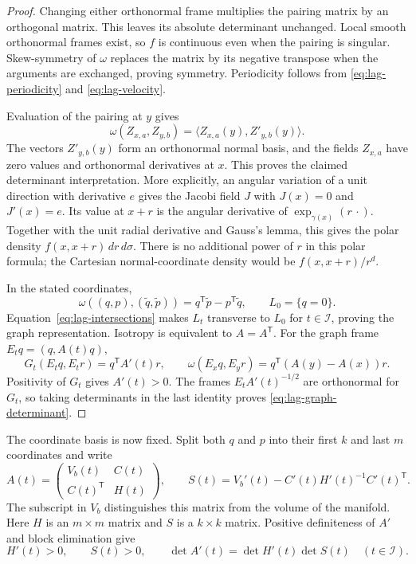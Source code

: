 \begin{proof}
Changing either orthonormal frame multiplies the pairing matrix by an
orthogonal matrix.  This leaves its absolute determinant unchanged.
Local smooth orthonormal frames exist, so $f$ is continuous even when
the pairing is singular.  Skew-symmetry of $\omega$ replaces the matrix
by its negative transpose when the arguments are exchanged, proving
symmetry.  Periodicity follows from
\eqref{eq:lag-periodicity} and \eqref{eq:lag-velocity}.

Evaluation of the pairing at $y$ gives
\[
 \omega(Z_{x,a},Z_{y,b})
 =\langle Z_{x,a}(y),Z'_{y,b}(y)\rangle.
\]
The vectors $Z'_{y,b}(y)$ form an orthonormal normal basis, and the
fields $Z_{x,a}$ have zero values and orthonormal derivatives at $x$.
This proves the claimed determinant interpretation.  More explicitly,
an angular variation of a unit direction with derivative $e$ gives the
Jacobi field $J$ with $J(x)=0$ and $J'(x)=e$.  Its value at $x+r$ is the
angular derivative of $\exp_{\gamma(x)}(r\,\cdot)$.  Together with the
unit radial derivative and Gauss's lemma, this gives the polar density
$f(x,x+r)\,dr\,d\sigma$.  There is no additional power of $r$ in this
polar formula; the Cartesian normal-coordinate density would be
$f(x,x+r)/r^d$.

In the stated coordinates,
\[
 \omega((q,p),(\widetilde q,\widetilde p))
 =q^{\mathsf T}\widetilde p-p^{\mathsf T}\widetilde q,
 \qquad L_0=\{q=0\}.
\]
Equation~\eqref{eq:lag-intersections} makes $L_t$ transverse to $L_0$
for $t\in\mathcal I$, proving the graph representation.  Isotropy is
equivalent to $A=A^{\mathsf T}$.  For the graph frame
$E_tq=(q,A(t)q)$,
\[
 G_t(E_tq,E_tr)=q^{\mathsf T}A'(t)r,
 \qquad
 \omega(E_xq,E_yr)=q^{\mathsf T}(A(y)-A(x))r.
\]
Positivity of $G_t$ gives $A'(t)>0$.  The frames
$E_tA'(t)^{-1/2}$ are orthonormal for $G_t$, so taking determinants in
the last identity proves \eqref{eq:lag-graph-determinant}.
\end{proof}

The coordinate basis is now fixed.  Split both $q$ and $p$ into their
first $k$ and last $m$ coordinates and write
\begin{equation}
 A(t)=
 \begin{pmatrix}
  V_b(t)&C(t)\\ C(t)^{\mathsf T}&H(t)
 \end{pmatrix},
 \qquad
 S(t)=V_b'(t)-C'(t)H'(t)^{-1}C'(t)^{\mathsf T}.
 \label{eq:lag-blocks}
\end{equation}
The subscript in $V_b$ distinguishes this matrix from the volume of the
manifold.  Here $H$ is an $m\times m$ matrix and $S$ is a $k\times k$
matrix.  Positive definiteness of $A'$ and block elimination give
\begin{equation}
 H'(t)>0,\qquad S(t)>0,\qquad
 \det A'(t)=\det H'(t)\det S(t)
 \quad(t\in\mathcal I).
 \label{eq:lag-velocity-factorization}
\end{equation}

